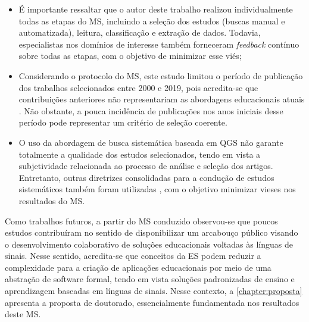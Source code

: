 \begin{itemize}
\item É importante ressaltar que o autor deste trabalho realizou individualmente todas as etapas do MS, incluindo a seleção dos estudos (buscas manual e automatizada), leitura, classificação e extração de dados. Todavia, especialistas nos domínios de interesse também forneceram \textit{feedback} contínuo sobre todas as etapas, com o objetivo de minimizar esse viés; 
\item Considerando o protocolo do MS, este estudo limitou o período de publicação dos trabalhos selecionados entre 2000 e 2019, pois acredita-se que contribuições anteriores não representariam as abordagens educacionais atuais \cite{Radermacher2013,Scatalon2019}. Não obstante, a pouca incidência de publicações nos anos iniciais desse período pode representar um critério de seleção coerente.
\item O uso da abordagem de busca sistemática baseada em QGS \cite{Zhang2011} não garante totalmente a qualidade dos estudos selecionados, tendo em vista a subjetividade relacionada ao processo de análise e seleção dos artigos. Entretanto, outras diretrizes consolidadas para a condução de estudos sistemáticos também foram utilizadas \cite{Kitchenham2007,Petersen2015}, com o objetivo minimizar vieses nos resultados do MS.
\end{itemize}

Como trabalhos futuros, a partir do MS conduzido observou-se que poucos estudos contribuíram no sentido de disponibilizar um arcabouço público visando o desenvolvimento colaborativo de soluções educacionais voltadas às línguas de sinais. Nesse sentido, acredita-se que conceitos da ES podem reduzir a complexidade para a criação de aplicações educacionais por meio de uma abstração de software formal, tendo em vista soluções padronizadas de ensino e aprendizagem baseadas em línguas de sinais. Nesse contexto, a \autoref{chapter:proposta} apresenta a proposta de doutorado, essencialmente fundamentada nos resultados deste MS.